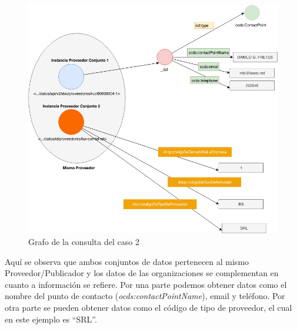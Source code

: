      \begin{figure}[ht!]
        \centering
        \includegraphics[width=150mm]{figuras/Diagramas-Caso2.png}
        \caption{Grafo de la consulta del caso 2}
        \label{img:DiagramaCaso2}
     \end{figure}

     Aquí se observa que ambos conjuntos de datos pertenecen al mismo Proveedor/Publicador y los datos de las organizaciones se complementan en cuanto a información se refiere. Por una parte podemos obtener datos como el nombre del punto de contacto (\textit{ocds:contactPointName}), email y teléfono. Por otra parte se pueden obtener datos como el código de tipo de proveedor, el cual en este ejemplo es “SRL”. 

    